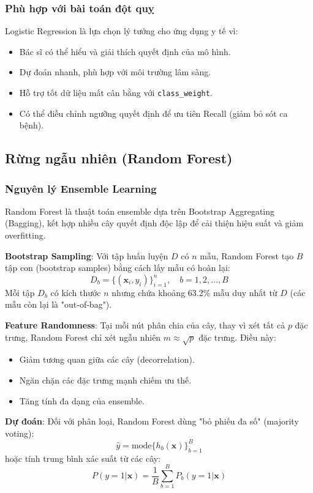 ﻿\documentclass{article}
\begin{document}
\subsubsection*{Phù hợp với bài toán đột quỵ}
Logistic Regression là lựa chọn lý tưởng cho ứng dụng y tế vì:
\begin{itemize}
    \item Bác sĩ có thể hiểu và giải thích quyết định của mô hình.
    \item Dự đoán nhanh, phù hợp với môi trường lâm sàng.
    \item Hỗ trợ tốt dữ liệu mất cân bằng với \texttt{class\_weight}.
    \item Có thể điều chỉnh ngưỡng quyết định để ưu tiên Recall (giảm bỏ sót ca bệnh).
\end{itemize}

\subsection{Rừng ngẫu nhiên (Random Forest)}

\subsubsection*{Nguyên lý Ensemble Learning}
Random Forest là thuật toán ensemble dựa trên Bootstrap Aggregating (Bagging), kết hợp nhiều cây quyết định độc lập để cải thiện hiệu suất và giảm overfitting.

\textbf{Bootstrap Sampling}: Với tập huấn luyện $D$ có $n$ mẫu, Random Forest tạo $B$ tập con (bootstrap samples) bằng cách lấy mẫu có hoàn lại:
\begin{equation}
D_b = \{(\mathbf{x}_i, y_i)\}_{i=1}^{n}, \quad b = 1, 2, ..., B
\end{equation}
Mỗi tập $D_b$ có kích thước $n$ nhưng chứa khoảng 63.2\% mẫu duy nhất từ $D$ (các mẫu còn lại là "out-of-bag").

\textbf{Feature Randomness}: Tại mỗi nút phân chia của cây, thay vì xét tất cả $p$ đặc trưng, Random Forest chỉ xét ngẫu nhiên $m \approx \sqrt{p}$ đặc trưng. Điều này:
\begin{itemize}
    \item Giảm tương quan giữa các cây (decorrelation).
    \item Ngăn chặn các đặc trưng mạnh chiếm ưu thế.
    \item Tăng tính đa dạng của ensemble.
\end{itemize}

\textbf{Dự đoán}: Đối với phân loại, Random Forest dùng "bỏ phiếu đa số" (majority voting):
\begin{equation}
\hat{y} = \text{mode}\{h_b(\mathbf{x})\}_{b=1}^{B}
\end{equation}
hoặc tính trung bình xác suất từ các cây:
\begin{equation}
P(y=1|\mathbf{x}) = \frac{1}{B}\sum_{b=1}^{B}P_b(y=1|\mathbf{x})
\end{equation}
\end{document}
